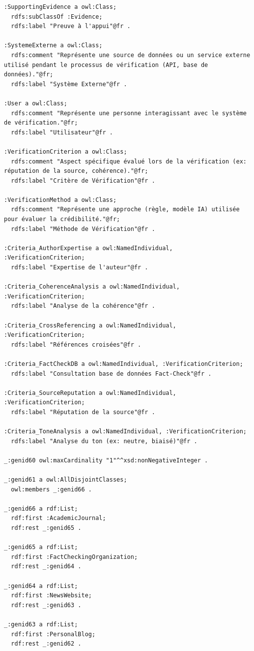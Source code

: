 \documentclass[9pt,twocolumn,twoside,french]{article}
\begin{document}
\begin{lstlisting}[language=Turtle,basicstyle=\ttfamily\tiny,frame=single]
:SupportingEvidence a owl:Class;
  rdfs:subClassOf :Evidence;
  rdfs:label "Preuve à l'appui"@fr .

:SystemeExterne a owl:Class;
  rdfs:comment "Représente une source de données ou un service externe utilisé pendant le processus de vérification (API, base de données)."@fr;
  rdfs:label "Système Externe"@fr .

:User a owl:Class;
  rdfs:comment "Représente une personne interagissant avec le système de vérification."@fr;
  rdfs:label "Utilisateur"@fr .

:VerificationCriterion a owl:Class;
  rdfs:comment "Aspect spécifique évalué lors de la vérification (ex: réputation de la source, cohérence)."@fr;
  rdfs:label "Critère de Vérification"@fr .

:VerificationMethod a owl:Class;
  rdfs:comment "Représente une approche (règle, modèle IA) utilisée pour évaluer la crédibilité."@fr;
  rdfs:label "Méthode de Vérification"@fr .

:Criteria_AuthorExpertise a owl:NamedIndividual, :VerificationCriterion;
  rdfs:label "Expertise de l'auteur"@fr .

:Criteria_CoherenceAnalysis a owl:NamedIndividual, :VerificationCriterion;
  rdfs:label "Analyse de la cohérence"@fr .

:Criteria_CrossReferencing a owl:NamedIndividual, :VerificationCriterion;
  rdfs:label "Références croisées"@fr .

:Criteria_FactCheckDB a owl:NamedIndividual, :VerificationCriterion;
  rdfs:label "Consultation base de données Fact-Check"@fr .

:Criteria_SourceReputation a owl:NamedIndividual, :VerificationCriterion;
  rdfs:label "Réputation de la source"@fr .

:Criteria_ToneAnalysis a owl:NamedIndividual, :VerificationCriterion;
  rdfs:label "Analyse du ton (ex: neutre, biaisé)"@fr .

_:genid60 owl:maxCardinality "1"^^xsd:nonNegativeInteger .

_:genid61 a owl:AllDisjointClasses;
  owl:members _:genid66 .

_:genid66 a rdf:List;
  rdf:first :AcademicJournal;
  rdf:rest _:genid65 .

_:genid65 a rdf:List;
  rdf:first :FactCheckingOrganization;
  rdf:rest _:genid64 .

_:genid64 a rdf:List;
  rdf:first :NewsWebsite;
  rdf:rest _:genid63 .

_:genid63 a rdf:List;
  rdf:first :PersonalBlog;
  rdf:rest _:genid62 .


\end{lstlisting}
\end{document}
